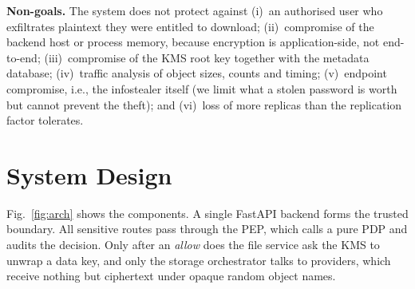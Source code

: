\documentclass[conference]{IEEEtran}
\begin{document}
\textbf{Non-goals.} The system does not protect against (i)~an authorised user who exfiltrates plaintext they were entitled to download; (ii)~compromise of the backend host or process memory, because encryption is application-side, not end-to-end; (iii)~compromise of the KMS root key together with the metadata database; (iv)~traffic analysis of object sizes, counts and timing; (v)~endpoint compromise, i.e., the infostealer itself (we limit what a stolen password is worth but cannot prevent the theft); and (vi)~loss of more replicas than the replication factor tolerates.

\section{System Design}
Fig.~\ref{fig:arch} shows the components. A single FastAPI backend forms the trusted boundary. All sensitive routes pass through the PEP, which calls a pure PDP and audits the decision. Only after an \emph{allow} does the file service ask the KMS to unwrap a data key, and only the storage orchestrator talks to providers, which receive nothing but ciphertext under opaque random object names.
\end{document}
